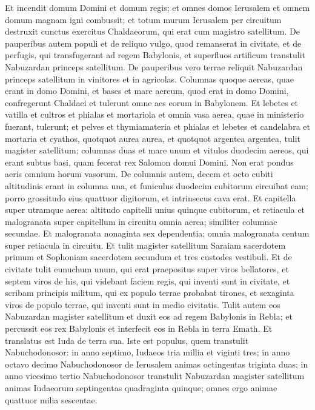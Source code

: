 \begin{biblechapter}
\verse Et incendit domum Domini et domum regis; et omnes domos Ierusalem et omnem domum magnam igni combussit; 
\verse et totum murum Ierusalem per circuitum destruxit cunctus exercitus Chaldaeorum, qui erat cum magistro satellitum. 
\verse De pauperibus autem populi et de reliquo vulgo, quod remanserat in civitate, et de perfugis, qui transfugerant ad regem Babylonis, et superfluos artificum transtulit Nabuzardan princeps satellitum. 
\verse De pauperibus vero terrae reliquit Nabuzardan princeps satellitum in vinitores et in agricolas. 
\verse Columnas quoque aereas, quae erant in domo Domini, et bases et mare aereum, quod erat in domo Domini, confregerunt Chaldaei et tulerunt omne aes eorum in Babylonem. 
\verse Et lebetes et vatilla et cultros et phialas et mortariola et omnia vasa aerea, quae in ministerio fuerant, tulerunt; 
\verse et pelves et thymiamateria et phialas et lebetes et candelabra et mortaria et cyathos, quotquot aurea aurea, et quotquot argentea argentea, tulit magister satellitum;  
\verse columnas duas et mare unum et vitulos duodecim aereos, qui erant subtus basi, quam fecerat rex Salomon domui Domini. Non erat pondus aeris omnium horum vasorum. 
\verse De columnis autem, decem et octo cubiti altitudinis erant in columna una, et funiculus duodecim cubitorum circuibat eam; porro grossitudo eius quattuor digitorum, et intrinsecus cava erat. 
\verse Et capitella super utramque aerea: altitudo capitelli unius quinque cubitorum, et retiacula et malogranata super capitellum in circuitu omnia aerea; similiter columnae secundae. 
\verse Et malogranata nonaginta sex dependentia; omnia malogranata centum super retiacula in circuitu. 
\verse Et tulit magister satellitum Saraiam sacerdotem primum et Sophoniam sacerdotem secundum et tres custodes vestibuli. 
\verse Et de civitate tulit eunuchum unum, qui erat praepositus super viros bellatores, et septem viros de his, qui videbant faciem regis, qui inventi sunt in civitate, et scribam principis militum, qui ex populo terrae probabat tirones, et sexaginta viros de populo terrae, qui inventi sunt in medio civitatis. 
\verse Tulit autem eos Nabuzardan magister satellitum et duxit eos ad regem Babylonis in Rebla; 
\verse et percussit eos rex Babylonis et interfecit eos in Rebla in terra Emath. Et translatus est Iuda de terra sua. 
\verse Iste est populus, quem transtulit Nabuchodonosor: in anno septimo, Iudaeos tria millia et viginti tres; 
\verse in anno octavo decimo Nabuchodonosor de Ierusalem animas octingentas triginta duas; 
\verse in anno vicesimo tertio Nabuchodonosor transtulit Nabuzardan magister satellitum animas Iudaeorum septingentas quadraginta quinque; omnes ergo animae quattuor milia sescentae. 

\end{biblechapter}

